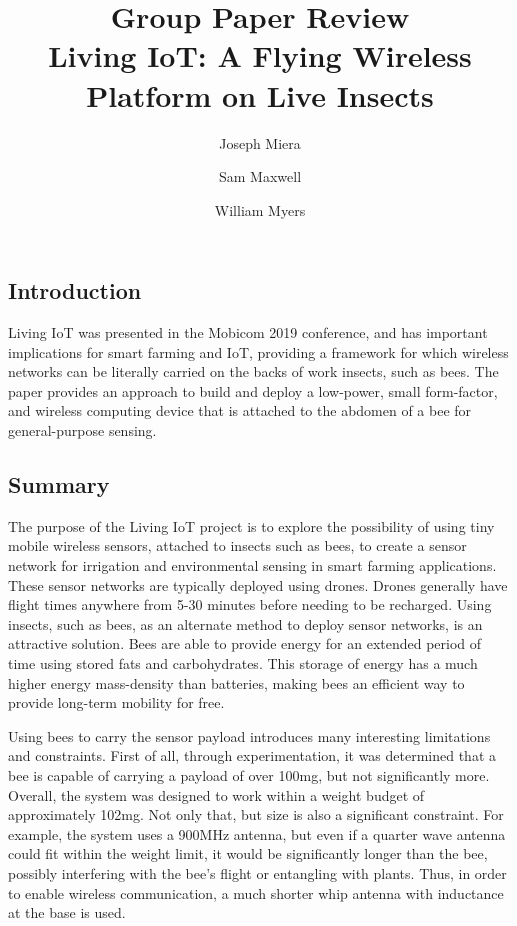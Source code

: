 \documentclass[letterpaper,twocolumn,10pt]{article}
\title{Group Paper Review\\
Living IoT: A Flying Wireless Platform on Live Insects}
\author{Joseph Miera}
\author{Sam Maxwell}
\author{William Myers}
\affil{Brigham Young University}
\begin{document}
\maketitle


\subsection*{Introduction}

Living IoT was presented in the Mobicom 2019 conference, and has important implications for smart farming and IoT, providing a framework for which wireless networks can be literally carried on the backs of work insects, such as bees. The paper provides an approach to build and deploy a low-power, small form-factor, and wireless computing device that is attached to the abdomen of a bee for general-purpose sensing.

\subsection*{Summary}
 
The purpose of the Living IoT project is to explore the possibility of using tiny mobile wireless sensors, attached to insects such as bees, to create a sensor network for irrigation and environmental sensing in smart farming applications. These sensor networks are typically deployed using drones. Drones generally have flight times anywhere from 5-30 minutes before needing to be recharged. Using insects, such as bees, as an alternate method to deploy sensor networks, is an attractive solution. Bees are able to provide energy for an extended period of time using stored fats and carbohydrates. This storage of energy has a much higher energy mass-density than batteries, making bees an efficient way to provide long-term mobility for free. 
 
Using bees to carry the sensor payload introduces many interesting limitations and constraints. First of all, through experimentation, it was determined that a bee is capable of carrying a payload of over 100mg, but not significantly more. Overall, the system was designed to work within a weight budget of approximately 102mg. Not only that, but size is also a significant constraint. For example, the system uses a 900MHz antenna, but even if a quarter wave antenna could fit within the weight limit, it would be significantly longer than the bee, possibly interfering with the bee's flight or entangling with plants. Thus, in order to enable wireless communication, a much shorter whip antenna with inductance at the base is used. 
\end{document}
